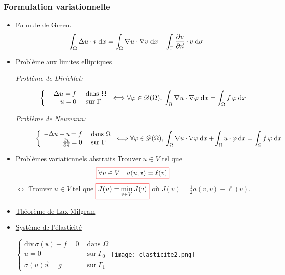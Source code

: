 \documentclass{article}
\def \de {{\rm d}}
\newcommand{\myredbox}[1]{\fcolorbox{red}{white}{$\displaystyle#1$}}
\begin{document}
\subsubsection*{Formulation variationnelle}
\begin{itemize}[label=\textbullet, font=\small \color{blue}]
\item \underline{Formule de Green:}
\[-\int_\Omega \Delta u\cdot v \; \de x = \int_\Omega \nabla u\cdot \nabla v \; \de x-\int_\Gamma  \frac{\partial v}{\partial \vec n} \cdot v \; \de \sigma\]
\item \underline{Problème aux limites elliptiques}
\begin{description}%
\item [{\it Problème de Dirichlet:}]
\[\left\{\begin{array}{rl}
-\Delta u = f & \mbox{ dans }\Omega \\
u=0 & \mbox{ sur }\Gamma 
\end{array}\right.  \Longleftrightarrow \forall \varphi\in {\cal D}(\Omega),\; \int_\Omega \nabla u\cdot \nabla \varphi \; \de x=\int_\Omega f\,\varphi \; \de x\]
\item[{\it Problème de Neumann:}]
\[\left\{\begin{array}{rl}
-\Delta u + u= f & \mbox{ dans }\Omega \\
\frac{\partial v}{\partial \vec n} =0 & \mbox{ sur }\Gamma 
\end{array}\right.  \Longleftrightarrow \forall \varphi\in {\cal D}(\Omega),\; \int_\Omega \nabla u\cdot \nabla \varphi \; \de x + \int_\Omega u\cdot  \varphi \; \de x =\int_\Omega f\,\varphi \; \de x\]
\end{description}

\item \underline{Problèmes variationnels abstraits}
Trouver $u\in V$ tel que
\[\myredbox{\forall v\in V\quad a(u,v)=\ell(v)}\]
$\Longleftrightarrow$ Trouver  $u\in V$ tel que $\myredbox{J(u)=\min_{v\in V}J(v)}$ où $J(v)=\frac 12 a(v,v)-\ell(v)$.
\item \underline{Théorème de Lax-Milgram}
\item \underline{Système de l'élasticité}

\hfill $\left\{\begin{array}{rl}
\mbox{div}\,\sigma(u) + f= 0 & \mbox{ dans }\Omega \\
u=0 & \mbox{ sur }\Gamma_0 \\
\sigma(u)\vec n=g & \mbox{ sur }\Gamma_1 
\end{array}\right. $\hfill \texttt{[image: elasticite2.png]} 


\end{itemize}
\end{document}
